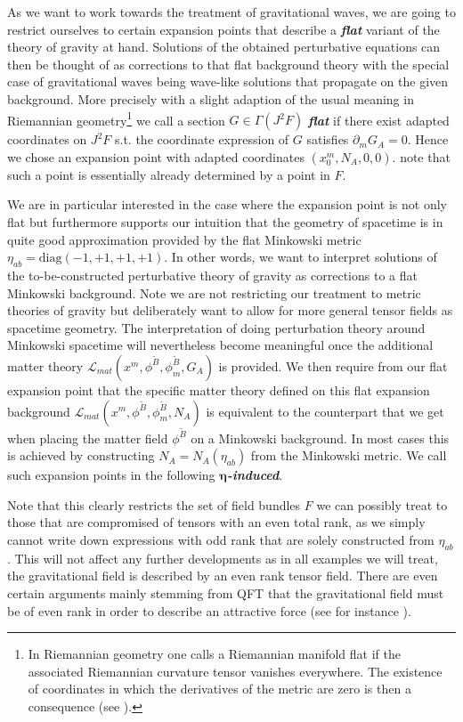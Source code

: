 As we want to work towards the treatment of gravitational waves, we are going to restrict ourselves to certain expansion points that describe a \textit{\textbf{flat}} variant of the theory of gravity at hand. Solutions of the obtained perturbative equations can then be thought of as corrections to that flat background theory with the special case of gravitational waves being wave-like solutions that propagate on the given background. More precisely with a slight adaption of the usual meaning in Riemannian geometry\footnote{In Riemannian geometry one calls a Riemannian manifold flat if the associated Riemannian curvature tensor vanishes everywhere. The existence of coordinates in which the derivatives of the metric are zero is then a consequence (see \cite{petersen2006riemannian}).} we call a section $G \in \Gamma(J^2F)$ \textit{\textbf{flat}} if there exist adapted coordinates on $J^2F$ s.t. the coordinate expression of $G$ satisfies $\partial_mG_{A}=0$.
Hence we chose an expansion point with adapted coordinates $(x_0^m,N_A,0,0)$. note that such a point is essentially already determined by a point in $F$. 

We are in particular interested in the case where the expansion point is not only flat but furthermore supports our intuition that the geometry of spacetime is in quite good approximation provided by the flat Minkowski metric $\eta_{ab} = \mathrm{diag}(-1,+1,+1,+1)$. 
%
%
In other words, we want to interpret solutions of the to-be-constructed perturbative theory of gravity as corrections to a flat Minkowski background. Note we are not restricting our treatment to metric theories of gravity but deliberately want to allow for more general tensor fields as spacetime geometry.
The interpretation of doing perturbation theory around Minkowski spacetime will nevertheless become meaningful once the additional matter theory $\mathcal{L}_{mat}(x^m,\phi^{\tilde{B}},\phi^{\tilde{B}}_m,G_A)$ is provided. We then require from our flat expansion point that the specific matter theory defined on this flat expansion background $\mathcal{L}_{mat}(x^m,\phi^{\tilde{B}},\phi^{\tilde{B}}_m,N_A)$ is equivalent to the counterpart that we get when placing the matter field $\phi^{\tilde{B}}$ on a Minkowski background. 
In most cases this is achieved by constructing $N_A = N_A(\eta_{ab})$ from the Minkowski metric. We call such expansion points in the following \textit{\textbf{$\boldsymbol{\eta}$-induced}}.

Note that this clearly restricts the set of field bundles $F$ we can possibly treat to those that are compromised of tensors with an even total rank, as we simply cannot write down expressions with odd rank that are solely constructed from $\eta_{ab}$. This will not affect any further developments as in all examples we will treat, the gravitational field is described by an even rank tensor field. There are even certain arguments mainly stemming from QFT that the gravitational field must be of even rank in order to describe an attractive force (see for instance \cite{vecchiato2017variational}). 

